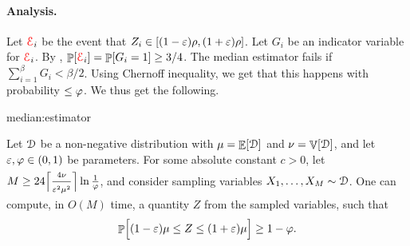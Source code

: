 \paragraph*{Analysis.}

Let ${\textcolor{red}{\EuScript{E}}}_i$ be the event that
$Z_i \in [(1-{\varepsilon})\rho, (1+{\varepsilon})\rho]$.  Let $G_i$ be an indicator
variable for ${\textcolor{red}{\EuScript{E}}}_i$. By ,
$\Prob{\Event_i} = \Prob{G_i=1} \geq 3/4$.  The median estimator fails
if $\sum_{i=1}^\beta G_i < \beta/2$. Using Chernoff inequality, we get
that this happens with probability $\leq \varphi$. We thus get the
following.


\bigskip

\begin{fragment}{median:estimator}
\begin{theorem}
    Let $\EuScript{D}$ be a non-negative distribution with
    $\mu = \mathop{\mathbb{E}}\!\left[ {\EuScript{D}} \right]$ and $\nu = \mathop{\mathbb{V}}\!\left[ {\EuScript{D}} \right]$, and
    let ${\varepsilon}, \varphi \in (0,1)$ be parameters.  For some absolute
    constant $c >0$, let
    $M \geq 24 \Bigl\lceil{ \frac{4 \nu\bigr.}{{\varepsilon}^2\mu^2\bigr.}  }
    \Bigr\rceil \ln \frac{1}{\varphi}$, and consider sampling
    variables $X_1, \ldots, X_M \sim \EuScript{D}$. One can compute,
    in $O(M)$ time, a quantity $Z$ from the sampled variables, such
    that
    \begin{equation*}
        \Prob{ (1-\eps)\mu \leq Z \leq (1+\eps)\mu \Bigr.} \geq 1 -
        \BadProb.
    \end{equation*}
\end{theorem}
\end{fragment}

